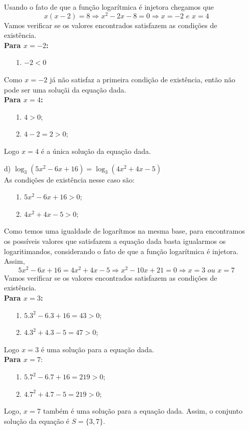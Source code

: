 \begin{exe}
\begin{itemize}
Usando o fato de que a função logarítmica é injetora chegamos que
$$x(x-2)=8 \Longrightarrow x^2-2x-8=0 \Longrightarrow x=-2 \,\, e \,\, x=4$$
Vamos verificar se os valores encontrados satisfazem as condições de existência. \\
\textbf{Para $x=-2$:}
\begin{enumerate}
    \item[1.] $-2<0$
\end{enumerate}
Como $x=-2$ já não satisfaz a primeira condição de existência, então não pode ser uma soluçãi da equação dada. \\
\textbf{Para $x=4$: }
\begin{enumerate}
    \item[1.] $4>0$;
    \item[2.] $4-2=2>0$;
\end{enumerate}
Logo $x=4$ é a única solução da equação dada.
    \color{black}
    \item[d)] $\log_3 (5x^2-6x+16)= \log_3(4x^2+4x-5)$ \\
    \color{red}
    As condições de existência nesse caso são:
    \begin{enumerate}
        \item[1.] $5x^2-6x+16>0$;
        \item[2.] $4x^2+4x-5>0$;
    \end{enumerate}
    Como temos uma igualdade de logarítmos na mesma base, para encontramos os possíveis valores que satisfazem a equação dada basta igualarmos os logaritimandos, considerando o fato de que a função logarítmica é injetora. Assim,
    $$5x^2-6x+16=4x^2+4x-5 \Longrightarrow x^2-10x+21=0 \Longrightarrow x=3 \,\, ou \,\, x=7$$
    Vamos verificar se os valores encontrados satisfazem as condições de existência. \\
    \textbf{Para $x=3$:}
    \begin{enumerate}
        \item[1.]$5.3^2-6.3+16=43>0$;
        \item[2.] $4.3^2+4.3-5=47>0$;
    \end{enumerate}
Logo $x=3$ é uma solução para a equação dada. \\
\textbf{Para $x=7$}: \\
\begin{enumerate}
        \item[1.]$5.7^2-6.7+16=219>0$;
        \item[2.] $4.7^2+4.7-5=219>0$;
    \end{enumerate}
Logo, $x=7$ também é uma solução para a equação dada. Assim, o conjunto solução da equação é $S=\{3,7\}$.
\end{itemize}
\color{black}
\end{exe}

